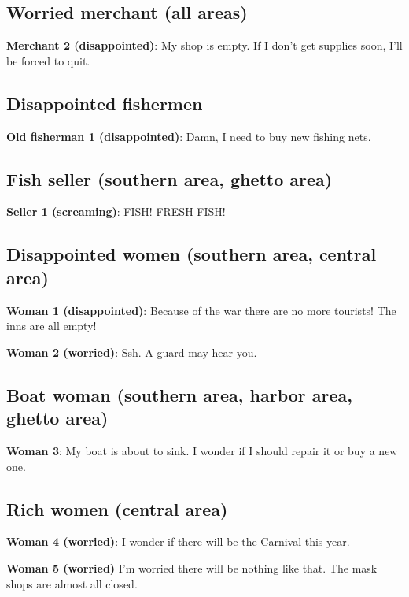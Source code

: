 \subsection{Worried merchant (all areas)}
\textbf{Merchant 2 (disappointed)}: My shop is empty. If I don't get supplies soon, I'll be forced to quit.

\subsection{Disappointed fishermen}
\textbf{Old fisherman 1 (disappointed)}: Damn, I need to buy new fishing nets.

\subsection{Fish seller (southern area, ghetto area)}
\textbf{Seller 1 (screaming)}: FISH! FRESH FISH!

\subsection{Disappointed women (southern area, central area)}
\textbf{Woman 1 (disappointed)}: Because of the war there are no more tourists! The inns are all empty!

\textbf{Woman 2 (worried)}: Ssh. A guard may hear you.

\subsection{Boat woman (southern area, harbor area, ghetto area)}
\textbf{Woman 3}: My boat is about to sink. I wonder if I should repair it or buy a new one.

\subsection{Rich women (central area)}
\textbf{Woman 4 (worried)}: I wonder if there will be the Carnival this year.

\textbf{Woman 5 (worried)} I'm worried there will be nothing like that. The mask shops are almost all closed.
